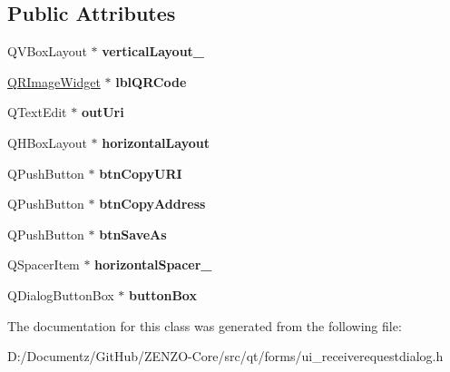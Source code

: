 \subsection*{Public Attributes}
\begin{DoxyCompactItemize}
\item 
\mbox{\label{class_ui___receive_request_dialog_a53b1bca323644f28d862e6b188b6bbc2}} 
Q\+V\+Box\+Layout $\ast$ {\bfseries vertical\+Layout\+\_}
\item 
\mbox{\label{class_ui___receive_request_dialog_ab4ea0eb5b4f1c3784aa77eaec36046be}} 
\mbox{\hyperlink{class_q_r_image_widget}{Q\+R\+Image\+Widget}} $\ast$ {\bfseries lbl\+Q\+R\+Code}
\item 
\mbox{\label{class_ui___receive_request_dialog_a51b77733bb2d8df6dab7b2bc78a40ca3}} 
Q\+Text\+Edit $\ast$ {\bfseries out\+Uri}
\item 
\mbox{\label{class_ui___receive_request_dialog_a6ff8785c7abc4dc916c4dd3ee36e8147}} 
Q\+H\+Box\+Layout $\ast$ {\bfseries horizontal\+Layout}
\item 
\mbox{\label{class_ui___receive_request_dialog_a09535dd36a128f008218100a02b57a92}} 
Q\+Push\+Button $\ast$ {\bfseries btn\+Copy\+U\+RI}
\item 
\mbox{\label{class_ui___receive_request_dialog_a0e9e1e65c1a9677ad963b1181bf23520}} 
Q\+Push\+Button $\ast$ {\bfseries btn\+Copy\+Address}
\item 
\mbox{\label{class_ui___receive_request_dialog_a3ca4df6c5e5b3883316d455c258aa420}} 
Q\+Push\+Button $\ast$ {\bfseries btn\+Save\+As}
\item 
\mbox{\label{class_ui___receive_request_dialog_ad1cba9f03924ede4cd205778f5df57b6}} 
Q\+Spacer\+Item $\ast$ {\bfseries horizontal\+Spacer\+\_}
\item 
\mbox{\label{class_ui___receive_request_dialog_a232268e68d06f3b860900fe7af066ba6}} 
Q\+Dialog\+Button\+Box $\ast$ {\bfseries button\+Box}
\end{DoxyCompactItemize}


The documentation for this class was generated from the following file\+:\begin{DoxyCompactItemize}
\item 
D\+:/\+Documentz/\+Git\+Hub/\+Z\+E\+N\+Z\+O-\/\+Core/src/qt/forms/ui\+\_\+receiverequestdialog.\+h\end{DoxyCompactItemize}
